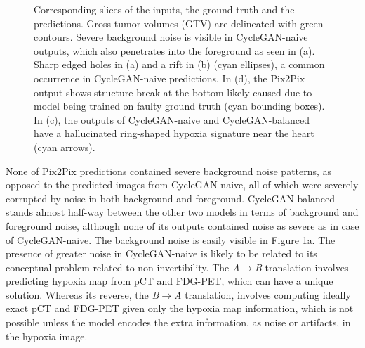 \begin{figure}
    \centering
    \caption{Corresponding slices of the inputs, the ground truth and the predictions. Gross tumor volumes (GTV) are delineated with green contours. Severe background noise is visible in CycleGAN-naive outputs, which also penetrates into the foreground as seen in (a). Sharp edged holes in (a) and a rift in (b) (cyan ellipses), a common occurrence in CycleGAN-naive predictions. In (d), the Pix2Pix output shows structure break at the bottom likely caused due to model being trained on faulty ground truth (cyan bounding boxes). In (c), the outputs of CycleGAN-naive and CycleGAN-balanced have a hallucinated ring-shaped hypoxia signature near the heart (cyan arrows).}
    \label{fig:hx4_image_quality_inspection_viz}
\end{figure}

None of Pix2Pix predictions contained severe background noise patterns, as opposed to the predicted images from CycleGAN-naive, all of which were severely corrupted by noise in both background and foreground. CycleGAN-balanced stands almost half-way between the other two models in terms of background and foreground noise, although none of its outputs contained noise as severe as in case of CycleGAN-naive. The background noise is easily visible in Figure \ref{fig:hx4_image_quality_inspection_viz}a. The presence of greater noise in CycleGAN-naive is likely to be related to its conceptual problem related to non-invertibility. The \textit{A}$\rightarrow$\textit{B} translation involves predicting hypoxia map from pCT and FDG-PET, which can have a unique solution. Whereas its reverse, the \textit{B}$\rightarrow$\textit{A} translation, involves computing ideally exact pCT and FDG-PET given only the hypoxia map information, which is not possible unless the model encodes the extra information, as noise or artifacts, in the hypoxia image.

